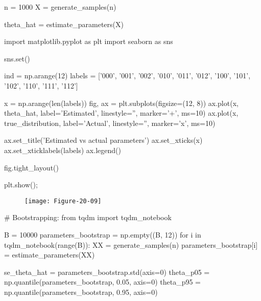 \begin{python}
n = 1000
X = generate_samples(n)
\end{python}

\begin{python}
theta_hat = estimate_parameters(X)
\end{python}

\begin{python}
import matplotlib.pyplot as plt
import seaborn as sns

sns.set()

ind = np.arange(12)
labels = ['000', '001', '002', '010', '011', '012', '100', '101', '102', '110', '111', '112']

x = np.arange(len(labels))
fig, ax = plt.subplots(figsize=(12, 8))
ax.plot(x, theta_hat, label='Estimated', linestyle='', marker='+', ms=10)
ax.plot(x, true_distribution, label='Actual', linestyle='', marker='x', ms=10)

ax.set_title('Estimated vs actual parameters')
ax.set_xticks(x)
ax.set_xticklabels(labels)
ax.legend()

fig.tight_layout()

plt.show();
\end{python}

\begin{figure}[H]
\texttt{[image: Figure-20-09]}
\end{figure}

\begin{python}
# Bootstrapping:
from tqdm import tqdm_notebook

B = 10000
parameters_bootstrap = np.empty((B, 12))
for i in tqdm_notebook(range(B)):
    XX = generate_samples(n)
    parameters_bootstrap[i] = estimate_parameters(XX)
    
se_theta_hat = parameters_bootstrap.std(axis=0)
theta_p05 = np.quantile(parameters_bootstrap, 0.05, axis=0)
theta_p95 = np.quantile(parameters_bootstrap, 0.95, axis=0)
\end{python}

